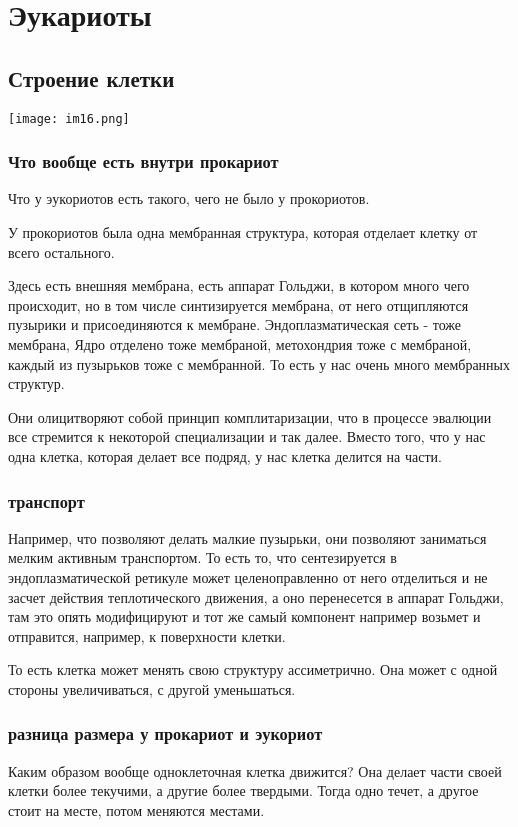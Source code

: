 ﻿\section{Эукариоты}

\subsection{Строение клетки}
\texttt{[image: im16.png]}
\subsubsection{Что вообще есть внутри прокариот}
Что у эукориотов есть такого, чего не было у прокориотов. 

У прокориотов была одна мембранная структура, которая отделает клетку от 
всего остального. 

Здесь есть внешняя мембрана, есть аппарат Гольджи, в котором много чего происходит, 
но в том числе синтизируется мембрана, от него отщипляются пузырики и присоединяются
к мембране. Эндоплазматическая сеть - тоже мембрана, Ядро отделено тоже мембраной, 
метохондрия тоже с мембраной, каждый из пузырьков тоже с мембранной. То есть 
у нас очень много мембранных структур. 

Они олицитворяют собой принцип комплитаризации, что в процессе эвалюции все 
стремится к некоторой специализации и так далее. Вместо того, 
что у нас одна клетка, которая делает все подряд, у нас клетка делится 
на части. 

\subsubsection{транспорт}
Например, что позволяют делать малкие пузырьки, они позволяют
заниматься мелким активным транспортом. То есть то, 
что сентезируется в эндоплазматической ретикуле может 
целеноправленно от него отделиться и не 
засчет действия теплотического движения, а оно перенесется 
в аппарат Гольджи, там это опять модифицируют и тот же самый 
компонент например возьмет и отправится, например, к поверхности клетки. 

То есть клетка может менять свою структуру ассиметрично. Она может 
с одной стороны увеличиваться, с другой уменьшаться. 

\subsubsection{разница размера у прокариот и эукориот}
Каким образом вообще одноклеточная клетка движится? 
Она делает части своей клетки более текучими, а
другие более твердыми. Тогда одно течет, а
другое стоит на месте, потом меняются местами. 

